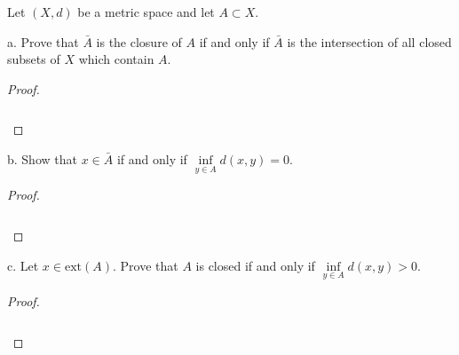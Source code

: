 Let $(X, d)$ be a metric space and let $A \subset X$.

a.  Prove that $\bar{A}$ is the closure of $A$ if and only if $\bar{A}$ is the intersection of all closed subsets of $X$
    which contain $A$.

\begin{proof}\renewcommand{\qedsymbol}{}\ \\\\
    \begin{align*}
    \end{align*}
\end{proof}

\pagebreak

b.  Show that $x \in \bar{A}$ if and only if $\inf\limits_{y \in A}{d(x, y)} = 0$.

\begin{proof}\renewcommand{\qedsymbol}{}\ \\\\
    \begin{align*}
    \end{align*}
\end{proof}

\pagebreak

c.  Let $x \in \text{ext}(A)$. Prove that $A$ is closed if and only if $\inf\limits_{y \in A}{d(x, y)} > 0$.

\begin{proof}\renewcommand{\qedsymbol}{}\ \\\\
    \begin{align*}
    \end{align*}
\end{proof}

\pagebreak